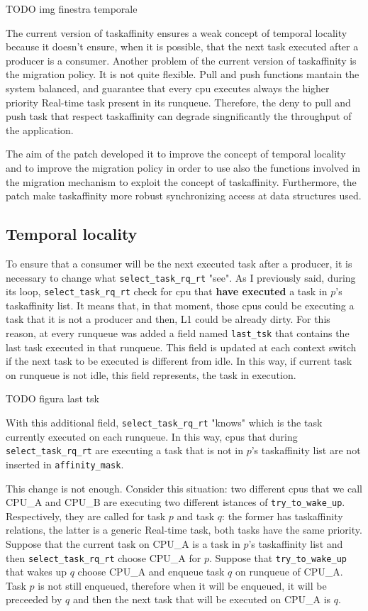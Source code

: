 TODO img finestra temporale

The current version of taskaffinity ensures a weak concept of temporal locality because it doesn't ensure, when it is possible, that the next task executed 
after a producer is a consumer. Another problem of the current version of taskaffinity is the migration policy. It is not quite flexible. Pull and push 
functions mantain the system balanced, and guarantee that every cpu executes always the higher priority Real-time task present in its runqueue.
Therefore, the deny to pull and push task that respect taskaffinity can degrade singnificantly the throughput of the application.

The aim of the patch developed it to improve the concept of temporal locality and to improve the migration policy in order to use also the functions 
involved in the migration mechanism to exploit the concept of taskaffinity. Furthermore, the patch make taskaffinity more robust synchronizing access at 
data structures used.

\subsection{Temporal locality}

To ensure that a consumer will be the next executed task after a producer, it is necessary to change what \texttt{select\_task\_rq\_rt} "see". As I 
previously said, during its loop, \texttt{select\_task\_rq\_rt} check for cpu that \textbf{have executed} a task in $p$'s taskaffinity list. It means
that, in that moment, those cpus could be executing a task that it is not a producer and then, L1 could be already dirty. For this reason, at every 
runqueue was added a field named \texttt{last\_tsk} that contains the last task executed in that runqueue. This field is updated at each context switch 
if the next task to be executed is different from idle. In this way, if current task on runqueue is not idle, this field represents, the task in execution. 

TODO figura last tsk

With this additional field, \texttt{select\_task\_rq\_rt} "knows" which is the task currently executed on each runqueue. In this way, cpus that during 
\texttt{select\_task\_rq\_rt} are executing a task that is not in $p$'s taskaffinity list are not inserted in \texttt{affinity\_mask}.

This change is not enough. Consider this situation: two different cpus that we call CPU\_A and CPU\_B are executing two different istances of 
\texttt{try\_to\_wake\_up}. Respectively, they are called for task $p$ and task $q$: the former has taskaffinity relations, the latter is a generic 
Real-time task, both tasks have the same priority. Suppose that the current task on CPU\_A is a task in $p$'s taskaffinity list and then 
\texttt{select\_task\_rq\_rt} choose CPU\_A for $p$. Suppose that \texttt{try\_to\_wake\_up} that wakes up $q$ choose CPU\_A and enqueue task $q$ on 
runqueue of CPU\_A. Task $p$ is not still enqueued, therefore when it will be enqueued, it will be preceeded by $q$ and then the next task that will
be executed on CPU\_A is $q$.

